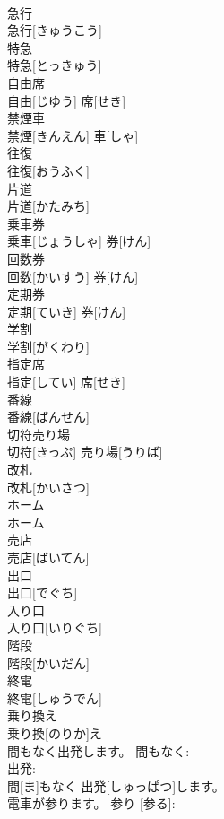 \documentclass[8pt]{extreport}
\begin{document}
\begin{CJK}{UTF8}{min}
\\	急行	
\\	急行[きゅうこう]		
\\	特急	
\\	特急[とっきゅう]		
\\	自由席	
\\	自由[じゆう] 席[せき]		
\\	禁煙車	
\\	禁煙[きんえん] 車[しゃ]		
\\	往復	
\\	往復[おうふく]		
\\	片道	
\\	片道[かたみち]		
\\	乗車券	
\\	乗車[じょうしゃ] 券[けん]		
\\	回数券	
\\	回数[かいすう] 券[けん]		
\\	定期券	
\\	定期[ていき] 券[けん]		
\\	学割	
\\	学割[がくわり]		
\\	指定席	
\\	指定[してい] 席[せき]		
\\	番線	
\\	番線[ばんせん]		
\\	切符売り場	
\\	切符[きっぷ] 売り場[うりば]		
\\	改札	
\\	改札[かいさつ]		
\\	ホーム	
\\	ホーム		
\\	売店	
\\	売店[ばいてん]		
\\	出口	
\\	出口[でぐち]		
\\	入り口	
\\	入り口[いりぐち]		
\\	階段	
\\	階段[かいだん]		
\\	終電	
\\	終電[しゅうでん]		
\\	乗り換え	
\\	乗り換[のりか]え		
\\	間もなく出発します。	間もなく: 
\\	出発: 
\\	間[ま]もなく 出発[しゅっぱつ]します。		
\\	電車が参ります。	参り [参る]: 

\end{CJK}
\end{document}
